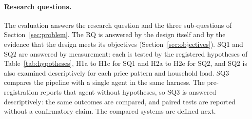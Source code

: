 \documentclass[12pt,a4paper]{report}
\begin{document}
\paragraph{Research questions.} The evaluation answers the research
question and the three sub-questions of Section~\ref{sec:problem}. The
RQ is answered by the design itself and by the evidence that the design
meets its objectives (Section~\ref{sec:objectives}). SQ1 and SQ2 are
answered by measurement: each is tested by the registered hypotheses of
Table~\ref{tab:hypotheses}, H1a to H1c for SQ1 and H2a to H2e for SQ2,
and SQ2 is also examined descriptively for each price pattern and
household load. SQ3 compares the pipeline with a single agent in the
same harness. The pre-registration reports that agent without
hypotheses, so SQ3 is answered descriptively: the same outcomes are
compared, and paired tests are reported without a confirmatory claim.
The compared systems are defined next.
\end{document}
